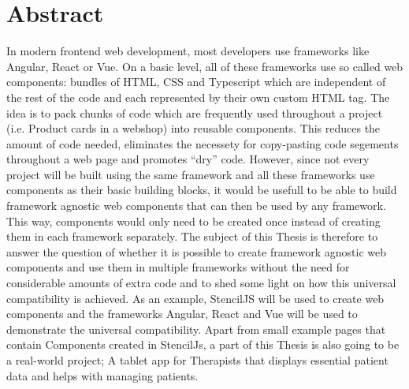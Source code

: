 \chapter{Abstract}
\label{cha:abstract}

In modern frontend web development, most developers use frameworks like Angular, React or Vue. On a basic level, all of these frameworks use so called web components: bundles of HTML, CSS and Typescript which are independent of the rest of the code and each represented by their own custom HTML tag. The idea is to pack chunks of code which are frequently used throughout a project (i.e. Product cards in a webshop) into reusable components. This reduces the amount of code needed, eliminates the necessety for copy-pasting code segements throughout a web page and promotes “dry” code. 
However, since not every project will be built using the same framework and all these frameworks use components as their basic building blocks, it would be usefull to be able to build framework agnostic web components that can then be used by any framework. This way, components would only need to be created once instead of creating them in each framework separately. 
The subject of this Thesis is therefore to answer the question of whether it is possible to create framework agnostic web components and use them in multiple frameworks without the need for considerable amounts of extra code and to shed some light on how this universal compatibility is achieved. As an example, StencilJS will be used to create web components and the frameworks Angular, React and Vue will be used to demonstrate the universal compatibility. 
Apart from small example pages that contain Components created in StencilJs, a part of this Thesis is also going to be a real-world project; A tablet app for Therapists that displays essential patient data and helps with managing patients. 


